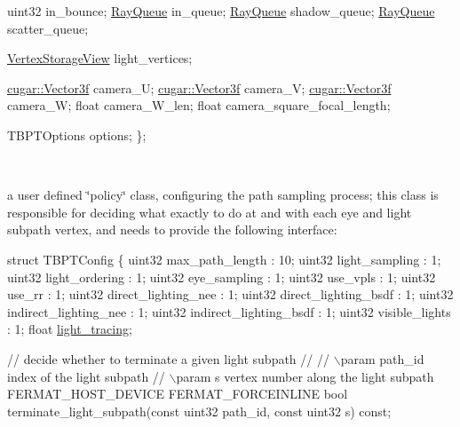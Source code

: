 \begin{DoxyParagraph}{}
\begin{DoxyEnumerate}
\begin{DoxyCodeInclude}
    uint32              in\_bounce;
    \hyperlink{struct_ray_queue}{RayQueue}            in\_queue;
    \hyperlink{struct_ray_queue}{RayQueue}            shadow\_queue;
    \hyperlink{struct_ray_queue}{RayQueue}            scatter\_queue;

    \hyperlink{struct_vertex_storage_view}{VertexStorageView}  light\_vertices;

    \hyperlink{structcugar_1_1_vector}{cugar::Vector3f}      camera\_U;
    \hyperlink{structcugar_1_1_vector}{cugar::Vector3f}      camera\_V;
    \hyperlink{structcugar_1_1_vector}{cugar::Vector3f}      camera\_W;
    \textcolor{keywordtype}{float}               camera\_W\_len;
    \textcolor{keywordtype}{float}               camera\_square\_focal\_length;

    TBPTOptions         options;
\};
\end{DoxyCodeInclude}
~\newline
\label{_b_p_t_lib_page_TBPTConfig}%
%

\item a user defined \char`\"{}policy\char`\"{} class, configuring the path sampling process; this class is responsible for deciding what exactly to do at and with each eye and light subpath vertex, and needs to provide the following interface\+: ~\newline

\begin{DoxyCode}
\textcolor{keyword}{struct }TBPTConfig
\{
   uint32  max\_path\_length         : 10;
   uint32  light\_sampling          : 1;
   uint32  light\_ordering          : 1;
   uint32  eye\_sampling            : 1;
   uint32  use\_vpls                : 1;
   uint32  use\_rr                  : 1;
   uint32  direct\_lighting\_nee     : 1;
   uint32  direct\_lighting\_bsdf    : 1;
   uint32  indirect\_lighting\_nee   : 1;
   uint32  indirect\_lighting\_bsdf  : 1;
   uint32  visible\_lights          : 1;
   \textcolor{keywordtype}{float}   \hyperlink{group___b_p_t_lib_ga497e0940986e5f948a9dcf42242d39c7}{light\_tracing};

   \textcolor{comment}{// decide whether to terminate a given light subpath}
   \textcolor{comment}{//}
   \textcolor{comment}{// \(\backslash\)param path\_id           index of the light subpath}
   \textcolor{comment}{// \(\backslash\)param s             vertex number along the light subpath}
   FERMAT\_HOST\_DEVICE FERMAT\_FORCEINLINE
   \textcolor{keywordtype}{bool} terminate\_light\_subpath(\textcolor{keyword}{const} uint32 path\_id, \textcolor{keyword}{const} uint32 s) \textcolor{keyword}{const};


\end{DoxyCode}
\end{DoxyEnumerate}
\end{DoxyParagraph}
